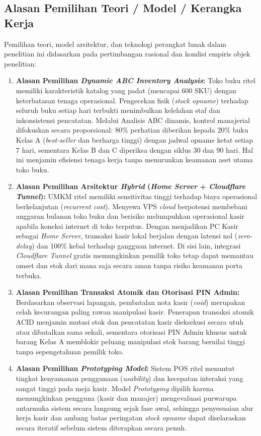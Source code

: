 \documentclass[11pt, a4paper]{article}
\begin{document}
\subsection{Alasan Pemilihan Teori / Model / Kerangka Kerja}
Pemilihan teori, model arsitektur, dan teknologi perangkat lunak dalam penelitian ini didasarkan pada pertimbangan rasional dan kondisi empiris objek penelitian:
\begin{enumerate}[label=\arabic*.]
    \item \textbf{Alasan Pemilihan \textit{Dynamic ABC Inventory Analysis}:} Toko buku ritel memiliki karakteristik katalog yang padat (mencapai 600 SKU) dengan keterbatasan tenaga operasional. Pengecekan fisik (\textit{stock opname}) terhadap seluruh buku setiap hari terbukti menimbulkan kelelahan staf dan inkonsistensi pencatatan. Melalui Analisis ABC dinamis, kontrol manajerial difokuskan secara proporsional: 80\% perhatian diberikan kepada 20\% buku Kelas A (\textit{best-seller} dan berharga tinggi) dengan jadwal opname ketat setiap 7 hari, sementara Kelas B dan C diperiksa dengan siklus 30 dan 90 hari. Hal ini menjamin efisiensi tenaga kerja tanpa menurunkan keamanan aset utama toko buku.
    \item \textbf{Alasan Pemilihan Arsitektur \textit{Hybrid} (\textit{Home Server} + \textit{Cloudflare Tunnel}):} UMKM ritel memiliki sensitivitas tinggi terhadap biaya operasional berkelanjutan (\textit{recurrent cost}). Menyewa VPS \textit{cloud} berpotensi membebani anggaran bulanan toko buku dan berisiko melumpuhkan operasional kasir apabila koneksi internet di toko terputus. Dengan menjadikan PC Kasir sebagai \textit{Home Server}, transaksi kasir lokal berjalan dengan latensi nol (\textit{zero-delay}) dan 100\% kebal terhadap gangguan internet. Di sisi lain, integrasi \textit{Cloudflare Tunnel} gratis memungkinkan pemilik toko tetap dapat memantau omset dan stok dari mana saja secara aman tanpa risiko keamanan porta terbuka.
    \item \textbf{Alasan Pemilihan Transaksi Atomik dan Otorisasi PIN Admin:} Berdasarkan observasi lapangan, pembatalan nota kasir (\textit{void}) merupakan celah kecurangan paling rawan manipulasi kasir. Penerapan transaksi atomik ACID menjamin mutasi stok dan pencatatan kasir dieksekusi secara utuh atau dibatalkan sama sekali, sementara otorisasi PIN Admin khusus untuk barang Kelas A memblokir peluang manipulasi stok barang bernilai tinggi tanpa sepengetahuan pemilik toko.
    \item \textbf{Alasan Pemilihan \textit{Prototyping Model}:} Sistem POS ritel menuntut tingkat kenyamanan penggunaan (\textit{usability}) dan kecepatan interaksi yang sangat tinggi pada meja kasir. Model \textit{Prototyping} dipilih karena memungkinkan pengguna (kasir dan manajer) mengevaluasi purwarupa antarmuka sistem secara langsung sejak fase awal, sehingga penyesuaian alur kerja kasir dan ambang batas peringatan \textit{stock opname} dapat diselaraskan secara iteratif sebelum sistem diterapkan secara penuh.
\end{enumerate}
\end{document}
